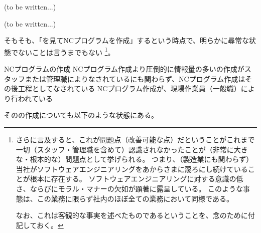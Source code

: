 \clearpage
(to be written...)


\clearpage
(to be written...)



\clearpage
そもそも、「\nameDrawing を見てNCプログラムを作成」するという時点で、明らかに尋常な状態でないことは言うまでもない
\footnote{さらに言及すると、これが問題点（改善可能な点）だということがこれまで一切（スタッフ・管理職を含めて）認識されなかったことが（非常に大きな・根本的な）問題点として挙げられる。
つまり、（製造業にも関わらず）当社がソフトウェアエンジニアリングをあからさまに蔑ろにし続けていることが根本に存在する。
ソフトウェアエンジニアリングに対する意識の低さ、ならびにモラル・マナーの欠如が顕著に露呈している。
このような事態は、この業務に限らず社内のほぼ全ての業務において同様である。

なお、これは客観的な事実を述べたものであるということを、念のために付記しておく。}。
\begin{Issues}{NCプログラムの作成}
NCプログラム作成より圧倒的に情報量の多い\nameDrawing の作成がスタッフまたは管理職によりなされているにも関わらず、NCプログラム作成はその後工程としてなされている
\tcbline*
NCプログラム作成が、現場作業員（一般職）により行われている
\end{Issues}
その\nameDrawing の作成についても以下のような状態にある。
